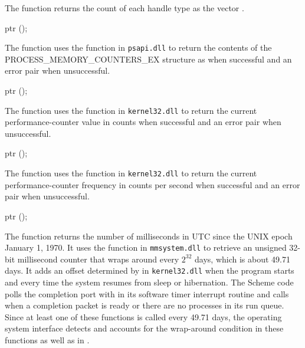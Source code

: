 The  function returns the count of each
handle type as the vector
.

\begin{function}
  ptr ();
\end{function}\antipar

The  function uses the
 function in \texttt{psapi.dll} to return
the contents of the PROCESS\_MEMORY\_COUNTERS\_EX structure
as
when successful and an error pair when unsuccessful.

\begin{function}
  ptr ();
\end{function}\antipar

The  function uses the
 function in \texttt{kernel32.dll} to
return the current performance-counter value in counts when successful
and an error pair when unsuccessful.

\begin{function}
  ptr ();
\end{function}\antipar

The  function uses the
 function in \texttt{kernel32.dll}
to return the current performance-counter frequency in counts per
second when successful and an error pair when unsuccessful.

\begin{function}
  ptr ();
\end{function}\antipar

The  function returns the number of
milliseconds in UTC since the UNIX epoch January 1, 1970. It uses the
 function in \texttt{mmsystem.dll} to retrieve an
unsigned 32-bit millisecond counter that wraps around every $2^{32}$
days, which is about 49.71 days.  It adds an offset determined by
 in \texttt{kernel32.dll} when the
program starts and every time the system resumes from sleep or
hibernation.  The Scheme code polls the completion port with
 in its software timer interrupt
routine and calls  when a completion
packet is ready or there are no processes in its run queue. Since at
least one of these functions is called every 49.71 days, the operating
system interface detects and accounts for the wrap-around condition in
these functions as well as in .

